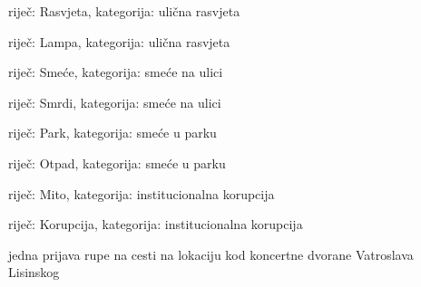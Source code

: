 \begin{packed_item}
\begin{packed_item}
					\item riječ: Rasvjeta, kategorija: ulična rasvjeta
					\item riječ: Lampa, kategorija: ulična rasvjeta
					\item riječ: Smeće, kategorija: smeće na ulici
					\item riječ: Smrdi, kategorija: smeće na ulici
					\item riječ: Park, kategorija: smeće u parku
					\item riječ: Otpad, kategorija: smeće u parku
					\item riječ: Mito, kategorija: institucionalna korupcija
					\item riječ: Korupcija, kategorija: institucionalna korupcija
				\end{packed_item}
				\item jedna prijava rupe na cesti na lokaciju kod koncertne dvorane Vatroslava Lisinskog
			\end{packed_item}
			
			\eject 